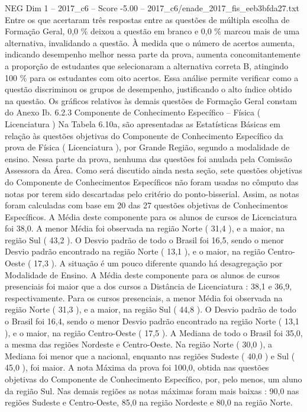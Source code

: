 \begin{textsample}{NEG Dim 1 – 2017\_c6 – Score -5.00 – 2017\_c6/enade\_2017\_fis\_eeb3bfda27.txt}
Entre os que acertaram três respostas entre as questões de múltipla escolha de Formação Geral, 0,0 \% deixou a questão em branco e 0,0 \% marcou mais de uma alternativa, invalidando a questão.
À medida que o número de acertos aumenta, indicando desempenho melhor nessa parte da prova, aumenta concomitantemente a proporção de estudantes que selecionaram a alternativa correta B, atingindo 100 \% para os estudantes com oito acertos.
Essa análise permite verificar como a questão discriminou os grupos de desempenho, justificando o alto índice obtido na questão.
Os gráficos relativos às demais questões de Formação Geral constam do Anexo Ib. 6.2.3 Componente de Conhecimento Específico – Física ( Licenciatura ) Na Tabela 6.10a, são apresentadas as Estatísticas Básicas em relação às questões objetivas do Componente de Conhecimento Específico da prova de Física ( Licenciatura ), por Grande Região, segundo a modalidade de ensino.
Nessa parte da prova, nenhuma das questões foi anulada pela Comissão Assessora da Área.
Como será discutido ainda nesta seção, sete questões objetivas do Componente de Conhecimentos Específicos não foram usadas no cômputo das notas por terem sido descartadas pelo critério do ponto-bisserial.
Assim, as notas foram calculadas com base em 20 das 27 questões objetivas de Conhecimentos Específicos.
A Média deste componente para os alunos de cursos de Licenciatura foi 38,0.
A menor Média foi observada na região Norte ( 31,4 ), e a maior, na região Sul ( 43,2 ).
O Desvio padrão de todo o Brasil foi 16,5, sendo o menor Desvio padrão encontrado na região Norte ( 13,1 ), e o maior, na região Centro-Oeste ( 17,3 ).
A situação é um pouco diferente quando há desagregação por Modalidade de Ensino.
A Média deste componente para os alunos de cursos presenciais foi maior que a dos cursos a Distância de Licenciatura : 38,1 e 36,9, respectivamente.
Para os cursos presenciais, a menor Média foi observada na região Norte ( 31,3 ), e a maior, na região Sul ( 44,8 ).
O Desvio padrão de todo o Brasil foi 16,4, sendo o menor Desvio padrão encontrado na região Norte ( 13,1 ), e o maior, na região Centro-Oeste ( 17,5 ).
A Mediana de todo o Brasil foi 35,0, a mesma das regiões Nordeste e Centro-Oeste.
Na região Norte ( 30,0 ), a Mediana foi menor que a nacional, enquanto nas regiões Sudeste ( 40,0 ) e Sul ( 45,0 ), foi maior.
A nota Máxima da prova foi 100,0, obtida nas questões objetivas do Componente de Conhecimento Específico, por, pelo menos, um aluno da região Sul.
Nas demais regiões as notas máximas foram mais baixas : 90,0 nas regiões Sudeste e Centro-Oeste, 85,0 na região Nordeste e 80,0 na região Norte.

\end{textsample}
